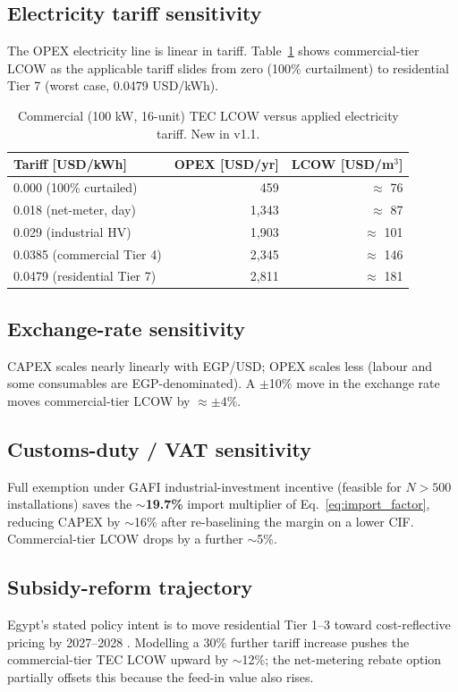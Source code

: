 \documentclass[11pt,a4paper]{article}
\begin{document}
\subsection{Electricity tariff sensitivity}
The OPEX electricity line is linear in tariff. Table~\ref{tab:egy_tariff_sens} shows commercial-tier LCOW as the applicable tariff slides from zero (100\% curtailment) to residential Tier 7 (worst case, 0.0479 USD/kWh).

\begin{table}[h]
\centering\small
\caption{Commercial (100 kW, 16-unit) TEC LCOW versus applied electricity tariff. New in v1.1.}
\label{tab:egy_tariff_sens}
\begin{tabular}{@{}lrr@{}}
\toprule
\textbf{Tariff [USD/kWh]} & \textbf{OPEX [USD/yr]} & \textbf{LCOW [USD/m$^3$]}\\
\midrule
0.000 (100\% curtailed)           & 459   & $\approx$ 76 \\
0.018 (net-meter, day)            & 1{,}343 & $\approx$ 87 \\
0.029 (industrial HV)             & 1{,}903 & $\approx$ 101 \\
0.0385 (commercial Tier 4)        & 2{,}345 & $\approx$ 146 \\
0.0479 (residential Tier 7)       & 2{,}811 & $\approx$ 181 \\
\bottomrule
\end{tabular}
\end{table}

\subsection{Exchange-rate sensitivity}
CAPEX scales nearly linearly with EGP/USD; OPEX scales less (labour and some consumables are EGP-denominated). A $\pm$10\% move in the exchange rate moves commercial-tier LCOW by $\approx\pm 4\%$.

\subsection{Customs-duty / VAT sensitivity}
Full exemption under GAFI industrial-investment incentive (feasible for $N>500$ installations) saves the \textbf{$\sim$19.7\%} import multiplier of Eq.~\ref{eq:import_factor}, reducing CAPEX by $\sim$16\% after re-baselining the margin on a lower CIF. Commercial-tier LCOW drops by a further $\sim$5\%.

\subsection{Subsidy-reform trajectory}
Egypt's stated policy intent is to move residential Tier 1--3 toward cost-reflective pricing by 2027--2028 \citep{egypt_subsidy_reform_2024}. Modelling a 30\% further tariff increase pushes the commercial-tier TEC LCOW upward by $\sim$12\%; the net-metering rebate option partially offsets this because the feed-in value also rises.
\end{document}
